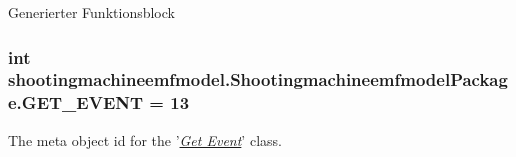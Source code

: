 Generierter Funktionsblock  \hypertarget{interfaceshootingmachineemfmodel_1_1_shootingmachineemfmodel_package_a455c42983e7a26435593b1a895505a0f}{
\subsubsection[{G\-E\-T\-\_\-\-E\-V\-E\-N\-T}]{\setlength{\rightskip}{0pt plus 5cm}int shootingmachineemfmodel.\-Shootingmachineemfmodel\-Package.\-G\-E\-T\-\_\-\-E\-V\-E\-N\-T = 13}}\label{interfaceshootingmachineemfmodel_1_1_shootingmachineemfmodel_package_a455c42983e7a26435593b1a895505a0f}
The meta object id for the '\hyperlink{classshootingmachineemfmodel_1_1impl_1_1_get_event_impl}{{\itshape Get Event}}' class.

